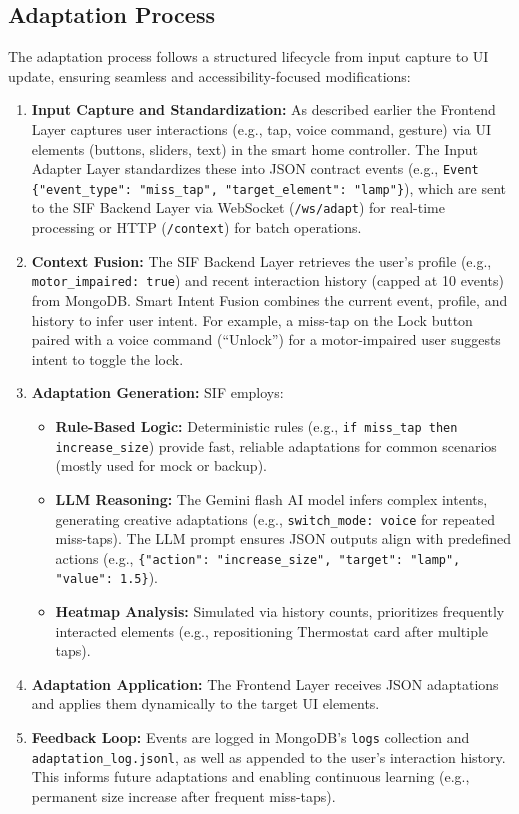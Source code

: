\documentclass[openany]{book}
\begin{document}
\subsection{Adaptation Process}
The adaptation process follows a structured lifecycle from input capture to UI update, ensuring seamless and accessibility-focused modifications:
\begin{enumerate}
    \item \textbf{Input Capture and Standardization:} As described earlier the Frontend Layer captures user interactions (e.g., tap, voice command, gesture) via UI elements (buttons, sliders, text) in the smart home controller. The Input Adapter Layer standardizes these into JSON contract events (e.g., \texttt{Event \{"event\_type": "miss\_tap", "target\_element": "lamp"\}}), which are sent to the SIF Backend Layer via WebSocket (\texttt{/ws/adapt}) for real-time processing or HTTP (\texttt{/context}) for batch operations.
    \item \textbf{Context Fusion:} The SIF Backend Layer retrieves the user’s profile (e.g., \texttt{motor\_impaired: true}) and recent interaction history (capped at 10 events) from MongoDB. Smart Intent Fusion combines the current event, profile, and history to infer user intent. For example, a miss-tap on the Lock button paired with a voice command (“Unlock”) for a motor-impaired user suggests intent to toggle the lock.
    \item \textbf{Adaptation Generation:} SIF employs:
        \begin{itemize}
            \item \textbf{Rule-Based Logic:} Deterministic rules (e.g., \texttt{if miss\_tap then increase\_size}) provide fast, reliable adaptations for common scenarios (mostly used for mock or backup).
            \item \textbf{LLM Reasoning:} The Gemini flash AI model infers complex intents, generating creative adaptations (e.g., \texttt{switch\_mode: voice} for repeated miss-taps). The LLM prompt ensures JSON outputs align with predefined actions (e.g., \texttt{\{"action": "increase\_size", "target": "lamp", "value": 1.5\}}).
            \item \textbf{Heatmap Analysis:} Simulated via history counts, prioritizes frequently interacted elements (e.g., repositioning Thermostat card after multiple taps).
        \end{itemize}
        \item \textbf{Adaptation Application:} The Frontend Layer receives JSON adaptations and applies them dynamically to the target UI elements.
        \item \textbf{Feedback Loop:} Events are logged in MongoDB’s \texttt{logs} collection and \texttt{adaptation\_log.jsonl}, as well as appended to the user’s interaction history. This informs future adaptations and enabling continuous learning (e.g., permanent size increase after frequent miss-taps).
\end{enumerate}
\end{document}
